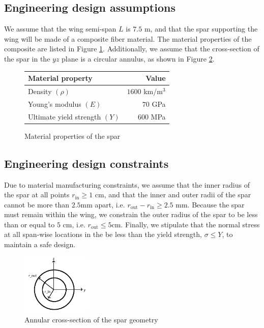 \documentclass[11pt]{article}
\begin{document}
\subsection{Engineering design assumptions}

We assume that the wing semi-span $L$ is $7.5$ m,
and that the spar supporting the wing will be made
of a composite fiber material. The material properties
of the composite are listed in Figure \ref{fig:materials}.
Additionally, we assume that the cross-section of
the spar in the $yz$ plane is a circular annulus,
as shown in Figure \ref{fig:annulus}.

\begin{figure}[hbt]
\centering
\begin{tabular}{ | l | r  |}
\hline
Material property & Value \\ \hline
Density $(\rho)$ & $1600$ km/m$^3$ \\ \hline
Young's modulus $(E)$ & $70$ GPa \\ \hline
Ultimate yield strength $(Y)$ & $600$ MPa \\ \hline
\end{tabular}
\caption{Material properties of the spar}
\label{fig:materials}
\end{figure}

\subsection{Engineering design constraints}

Due to material manufacturing constraints, we
assume that the inner radius of the spar at all
points $r_{\text{in}} \geq 1$ cm, and that the
inner and outer radii of the spar cannot be more
than $2.5$mm apart, i.e.
$r_{\text{out}} - r_{\text{in}} \geq 2.5$ mm.
Because the spar must remain within the wing, we
constrain the outer radius of the spar to be less
than or equal to $5$ cm, i.e. $r_{\text{out}} \leq 5$cm.
Finally, we stipulate that the normal stress at all
span-wise locations in the be less than the yield
strength, $\sigma \leq Y$, to maintain a safe design.

\begin{figure}[hbt]
\centering
\includegraphics[width=0.3\textwidth]{annulus}
\caption{Annular cross-section of the spar geometry}
\label{fig:annulus}
\end{figure}
\end{document}
